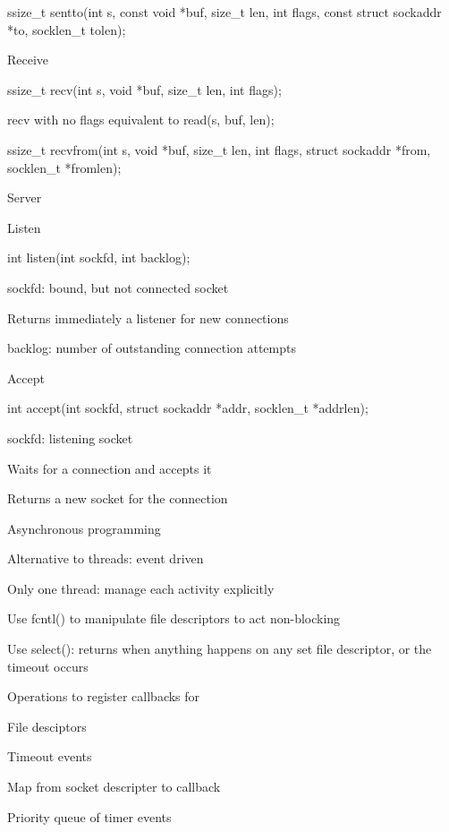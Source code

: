 			\item ssize\_t sentto(int s, const void *buf, size\_t len, int flags, const struct sockaddr *to, socklen\_t tolen);
		\enumend
		\item Receive
		\enumstart
			\item ssize\_t recv(int s, void *buf, size\_t len, int flags);
			\item recv with no flags equivalent to read(s, buf, len);
			\item ssize\_t recvfrom(int s, void *buf, size\_t len, int flags, struct sockaddr *from, socklen\_t *fromlen);
		\enumend
	\enumend
	\item Server
	\enumstart
		\item Listen
		\enumstart
			\item int listen(int sockfd, int backlog);
			\item sockfd: bound, but not connected socket
			\item Returns immediately a listener for new connections
			\item backlog: number of outstanding connection attempts
		\enumend
		\item Accept
		\enumstart
			\item int accept(int sockfd, struct sockaddr *addr, socklen\_t *addrlen);
			\item sockfd: listening socket
			\item Waits for a connection and accepts it
			\item Returns a new socket for the connection
		\enumend
	\enumend
	\item Asynchronous programming
	\enumstart
		\item Alternative to threads: event driven
		\item Only one thread: manage each activity explicitly
		\item Use fcntl() to manipulate file descriptors to act non-blocking
		\item Use select(): returns when anything happens on any set file descriptor, or the timeout occurs
		\item Operations to register callbacks for
		\enumstart
			\item File desciptors
			\item Timeout events
		\enumend
		\item Map from socket descripter to callback
		\item Priority queue of timer events
	\enumend
\enumend

